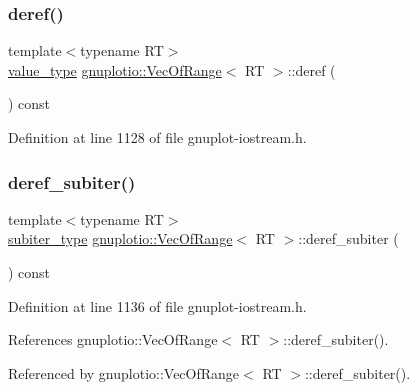 \subsubsection{\texorpdfstring{deref()}{deref()}}
{\footnotesize\ttfamily template$<$typename RT$>$ \\
\hyperlink{classgnuplotio_1_1_vec_of_range_aed503f2f8d8ed71b303f2db26872bafd}{value\+\_\+type} \hyperlink{classgnuplotio_1_1_vec_of_range}{gnuplotio\+::\+Vec\+Of\+Range}$<$ RT $>$\+::deref (\begin{DoxyParamCaption}{ }\end{DoxyParamCaption}) const\hspace{0.3cm}{\ttfamily [inline]}}



Definition at line 1128 of file gnuplot-\/iostream.\+h.

\mbox{\label{classgnuplotio_1_1_vec_of_range_a9b02d8bd8ec62ba77de16ad8ea8a87b2}} 
\subsubsection{\texorpdfstring{deref\+\_\+subiter()}{deref\_subiter()}}
{\footnotesize\ttfamily template$<$typename RT$>$ \\
\hyperlink{classgnuplotio_1_1_vec_of_range_a4cfae20b9797febceffafec3415b52db}{subiter\+\_\+type} \hyperlink{classgnuplotio_1_1_vec_of_range}{gnuplotio\+::\+Vec\+Of\+Range}$<$ RT $>$\+::deref\+\_\+subiter (\begin{DoxyParamCaption}{ }\end{DoxyParamCaption}) const\hspace{0.3cm}{\ttfamily [inline]}}



Definition at line 1136 of file gnuplot-\/iostream.\+h.



References gnuplotio\+::\+Vec\+Of\+Range$<$ R\+T $>$\+::deref\+\_\+subiter().



Referenced by gnuplotio\+::\+Vec\+Of\+Range$<$ R\+T $>$\+::deref\+\_\+subiter().

